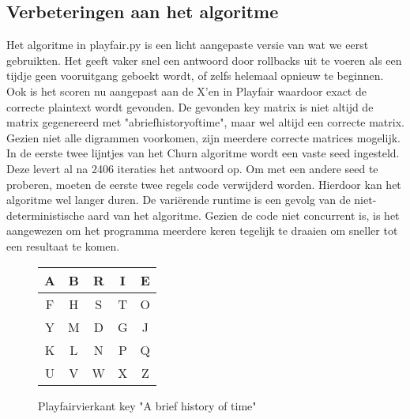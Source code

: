 \subsection{Verbeteringen aan het algoritme}
Het algoritme in playfair.py is een licht aangepaste versie van wat we eerst gebruikten. Het geeft vaker snel een antwoord door rollbacks uit te voeren als een tijdje geen vooruitgang geboekt wordt, of zelfs helemaal opnieuw te beginnen. Ook is het scoren nu aangepast aan de X'en in Playfair waardoor exact de correcte plaintext wordt gevonden. De gevonden key matrix is niet altijd de matrix gegenereerd met "abriefhistoryoftime", maar wel altijd een correcte matrix. Gezien niet alle digrammen voorkomen, zijn meerdere correcte matrices mogelijk. \\
In de eerste twee lijntjes van het Churn algoritme wordt een vaste seed ingesteld. Deze levert al na 2406 iteraties het antwoord op. Om met een andere seed te proberen, moeten de eerste twee regels code verwijderd worden. Hierdoor kan het algoritme wel langer duren. De vari\"erende runtime is een gevolg van de niet-deterministische aard van het algoritme. Gezien de code niet concurrent is, is het aangewezen om het programma meerdere keren tegelijk te draaien om sneller tot een resultaat te komen.

\begin{figure} [h!]
\centering
\begin{tabular}{c|c|c|c|c}
A&B&R&I&E\\ \hline
F&H&S&T&O\\ \hline
Y&M&D&G&J\\ \hline
K&L&N&P&Q\\ \hline
U&V&W&X&Z\\
\end{tabular}
\caption{Playfairvierkant key "A brief history of time"}
\end{figure}

